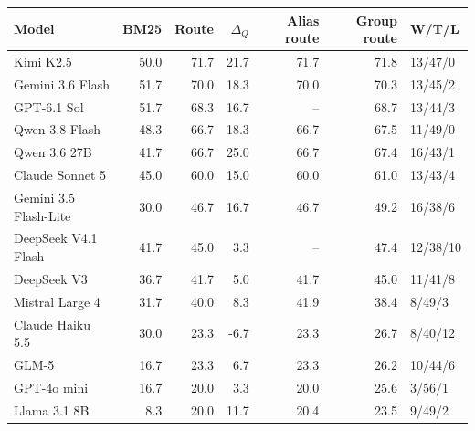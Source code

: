 \begin{tabular}{lrrrrrl}
\toprule
Model & BM25 & Route & $\Delta_Q$ & Alias route & Group route & W/T/L \\
\midrule
Kimi K2.5 & 50.0 & 71.7 & 21.7 & 71.7 & 71.8 & 13/47/0 \\
Gemini 3.6 Flash & 51.7 & 70.0 & 18.3 & 70.0 & 70.3 & 13/45/2 \\
GPT-6.1 Sol & 51.7 & 68.3 & 16.7 & -- & 68.7 & 13/44/3 \\
Qwen 3.8 Flash & 48.3 & 66.7 & 18.3 & 66.7 & 67.5 & 11/49/0 \\
Qwen 3.6 27B & 41.7 & 66.7 & 25.0 & 66.7 & 67.4 & 16/43/1 \\
Claude Sonnet 5 & 45.0 & 60.0 & 15.0 & 60.0 & 61.0 & 13/43/4 \\
Gemini 3.5 Flash-Lite & 30.0 & 46.7 & 16.7 & 46.7 & 49.2 & 16/38/6 \\
DeepSeek V4.1 Flash & 41.7 & 45.0 & 3.3 & -- & 47.4 & 12/38/10 \\
DeepSeek V3 & 36.7 & 41.7 & 5.0 & 41.7 & 45.0 & 11/41/8 \\
Mistral Large 4 & 31.7 & 40.0 & 8.3 & 41.9 & 38.4 & 8/49/3 \\
Claude Haiku 5.5 & 30.0 & 23.3 & -6.7 & 23.3 & 26.7 & 8/40/12 \\
GLM-5 & 16.7 & 23.3 & 6.7 & 23.3 & 26.2 & 10/44/6 \\
GPT-4o mini & 16.7 & 20.0 & 3.3 & 20.0 & 25.6 & 3/56/1 \\
Llama 3.1 8B & 8.3 & 20.0 & 11.7 & 20.4 & 23.5 & 9/49/2 \\
\bottomrule
\end{tabular}
